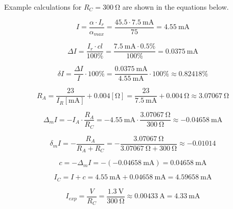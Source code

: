 Example calculations for $R_C = \SI{300}{\ohm}$ are shown in the equations below.

\begin{equation}
	I = \frac{\alpha\cdot I_r}{\alpha_{max}} = \frac{45.5\cdot \SI{7.5}{\milli\ampere}}{75} = \SI{4.55}{\milli\ampere}
\end{equation}

\begin{equation}
	\Delta I = \frac{I_r\cdot cl}{100\unit{\percent}} = \frac{\SI{7.5}{\milli\ampere}\cdot 0.5\unit{\percent}}{100\unit{\percent}} = \SI{0.0375}{\milli\ampere}
\end{equation}

\begin{equation}
	\delta I = \frac{\Delta I}{I}\cdot 100\unit{\percent} = \frac{\SI{0.0375}{\milli\ampere}}{\SI{4.55}{\milli\ampere}}\cdot 100\unit{\percent} \approx 0.82418\unit{\percent}
\end{equation}

\begin{equation}
	R_A = \frac{23}{I_R  [\unit{\milli\ampere}]} + 0.004 [\unit{\ohm}] = \frac{23}{\SI{7.5}{\milli\ampere}} + \SI{0.004}{\ohm} \approx \SI{3.07067}{\ohm}
\end{equation}

\begin{equation}
	\Delta_m I = -I_A \cdot\frac{R_A}{R_C} = -\SI{4.55}{\milli\ampere}\cdot\frac{\SI{3.07067}{\ohm}}{\SI{300}{\ohm}} \approx -\SI{0.04658}{\milli\ampere}
\end{equation}

\begin{equation}
	\delta_m I = -\frac{R_A}{R_A + R_C} = -\frac{\SI{3.07067}{\ohm}}{\SI{3.07067}{\ohm} + \SI{300}{\ohm}} \approx -0.01014
\end{equation}

\begin{equation}
	c = -\Delta_m I = -(-\SI{0.04658}{\milli\ampere}) = \SI{0.04658}{\milli\ampere}
\end{equation}

\begin{equation}
	I_C = I + c = \SI{4.55}{\milli\ampere} +\SI{0.04658}{\milli\ampere} = \SI{4.59658}{\milli\ampere}
\end{equation}

\begin{equation}
	I_{exp} = \frac{V}{R_C} = \frac{\SI{1.3}{\volt}}{\SI{300}{\ohm}} \approx \SI{0.00433}{\ampere} = \SI{4.33}{\milli\ampere}
\end{equation}

